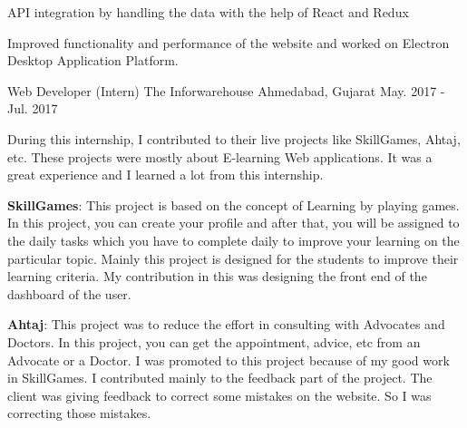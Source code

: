 \begin{cventries}
{\begin{cvitems}
        \item {API integration by handling the data with the help of React and Redux}
        \item {Improved functionality and performance of the website and worked on Electron Desktop Application Platform.}
      \end{cvitems}
    }
  \cventry
    {Web Developer (Intern)}
    {The Inforwarehouse}
    {Ahmedabad, Gujarat}
    {May. 2017 - Jul. 2017}
    {
      \begin{cvitems}
        \item {During this internship, I contributed to their live projects like SkillGames, Ahtaj, etc. These projects were mostly about E-learning Web applications. It was a great experience and I learned a lot from this internship.}
        \item {\textbf{SkillGames}: This project is based on the concept of Learning by playing games. In this project, you can create your profile and after that, you will be assigned to the daily tasks which you have to complete daily to improve your learning on the particular topic. Mainly this project is designed for the students to improve their learning criteria. My contribution in this was designing the front end of the dashboard of the user.}
        \item {\textbf{Ahtaj}: This project was to reduce the effort in consulting with Advocates and Doctors. In this project, you can get the appointment, advice, etc from an Advocate or a Doctor. I was promoted to this project because of my good work in SkillGames. I contributed mainly to the feedback part of the project. The client was giving feedback to correct some mistakes on the website. So I was correcting those mistakes.}
      \end{cvitems}
    }


\end{cventries}
